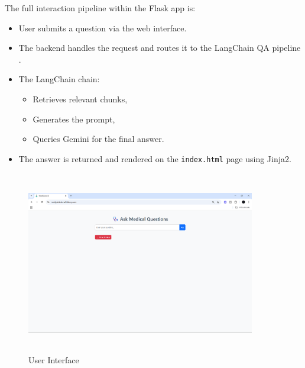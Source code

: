 \documentclass[12pt,a4paper]{report}
\begin{document}
The full interaction pipeline within the Flask app is:
\begin{itemize}
    \item User submits a question via the web interface.
    \item The backend handles the request and routes it to the LangChain QA pipeline \cite{langchain}.
    \item The LangChain chain:
    \begin{itemize}
        \item Retrieves relevant chunks,
        \item Generates the prompt,
        \item Queries Gemini for the final answer.
    \end{itemize}
    \item The answer is returned and rendered on the \texttt{index.html} page using Jinja2.
\end{itemize}


\begin{figure}[H]
    \centering
    \includegraphics[width=10cm, height=8cm]{UserInterface}
    \caption{User Interface}
    \label{fig:UserInterface}
\end{figure}
\end{document}
